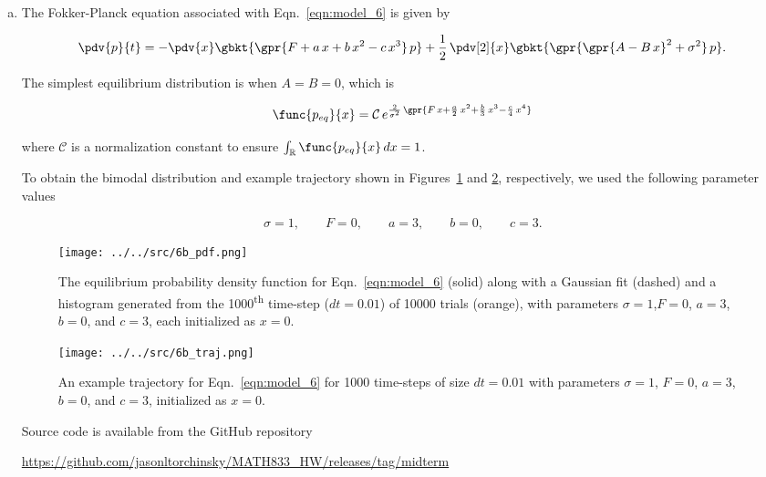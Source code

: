 \begin{enumerate}[a)]
	\item The Fokker-Planck equation associated with Eqn.~\ref{eqn:model_6} is given by
	
	\begin{equation}
		\pdv{p}{t} = -\pdv{x}\gbkt{\gpr{F + a\,x + b\,x^2 - c\,x^3}\,p} + \frac{1}{2}\,\pdv[2]{x}\gbkt{\gpr{\gpr{A - B\,x}^2 + \sigma^2}\,p}.
	\end{equation}
	
	The simplest equilibrium distribution is when $A = B = 0$, which is
	
	\begin{equation}
		\func{p_{eq}}{x} = \mathcal{C}\,e^{\frac{2}{\sigma^2}\,\gpr{F\,x + \frac{a}{2}\,x^2 + \frac{b}{3}\,x^3 - \frac{c}{4}\,x^4}}
	\end{equation}
	
	where $\mathcal{C}$ is a normalization constant to ensure $\int_{\mathbb{R}} \func{p_{eq}}{x}\,dx = 1$.
	
	To obtain the bimodal distribution and example trajectory shown in Figures~\ref{fig:6b_pdf} and \ref{fig:6b_traj}, respectively, we used the following parameter values
	
	\begin{equation}
		\sigma = 1,\qquad F = 0,\qquad a = 3,\qquad b = 0,\qquad c = 3.
	\end{equation}
	
	\begin{figure}[H]
		\centering
		\texttt{[image: ../../src/6b\_pdf.png]}
		\caption{The equilibrium probability density function for Eqn.~\ref{eqn:model_6} (solid) along with a Gaussian fit (dashed) and a histogram generated from the 1000\textsuperscript{th} time-step ($dt = 0.01$) of 10000 trials (orange), with parameters $\sigma = 1$,\qquad $F = 0$, $a = 3$, $b = 0$, and $c = 3$, each initialized as $x = 0$.}
		\label{fig:6b_pdf}
	\end{figure}
	
	\begin{figure}[H]
		\centering
		\texttt{[image: ../../src/6b\_traj.png]}
		\caption{An example trajectory for Eqn.~\ref{eqn:model_6} for 1000 time-steps of size $dt = 0.01$ with parameters $\sigma = 1$, $F = 0$, $a = 3$, $b = 0$, and $c = 3$, initialized as $x = 0$.}
		\label{fig:6b_traj}
	\end{figure}
	
	Source code is available from the GitHub repository
	
	\begin{center}
		\url{https://github.com/jasonltorchinsky/MATH833_HW/releases/tag/midterm}
	\end{center}


\end{enumerate}
